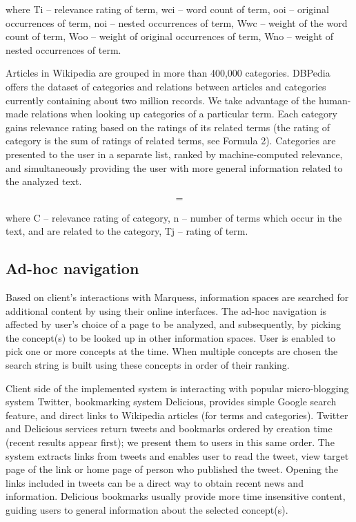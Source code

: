 \documentclass{llncs}
\begin{document}
where Ti – relevance rating of term, wci – word count of term, ooi – original occurrences of term, noi – nested occurrences of term, Wwc – weight of the word count of term, Woo – weight of original occurrences of term, Wno – weight of nested occurrences of term. 

Articles in Wikipedia are grouped in more than 400,000 categories. DBPedia offers the dataset of categories and relations between articles and categories currently containing about two million records. We take advantage of the human-made relations when looking up categories of a particular term. Each category gains relevance rating based on the ratings of its related terms (the rating of category is the sum of ratings of related terms, see Formula 2). Categories are presented to the user in a separate list, ranked by machine-computed relevance, and simultaneously providing the user with more general information related to the analyzed text.

\begin{equation}
=
\end{equation}

where C – relevance rating of category, n – number of terms which occur in the text, and are related to the category, Tj – rating of term.

\subsection{Ad-hoc navigation}

Based on client’s interactions with Marquess, information spaces are searched for additional content by using their online interfaces. The ad-hoc navigation is affected by user’s choice of a page to be analyzed, and subsequently, by picking the concept(s) to be looked up in other information spaces. User is enabled to pick one or more concepts at the time. When multiple concepts are chosen the search string is built using these concepts in order of their ranking. 
 
Client side of the implemented system is interacting with popular micro-blogging system Twitter, bookmarking system Delicious, provides simple Google search feature, and direct links to Wikipedia articles (for terms and categories). Twitter and Delicious services return tweets and bookmarks ordered by creation time (recent results appear first); we present them to users in this same order. The system extracts links from tweets and enables user to read the tweet, view target page of the link or home page of person who published the tweet. Opening the links included in tweets can be a direct way to obtain recent news and information. Delicious bookmarks usually provide more time insensitive content, guiding users to general information about the selected concept(s). 
\end{document}
